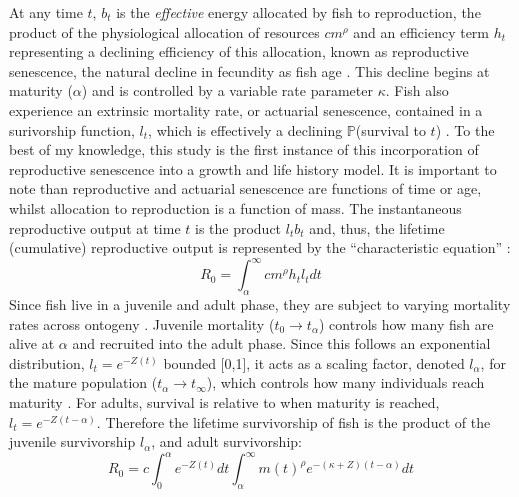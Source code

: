 \documentclass[a4paper]{article} %
\begin{document}
At any time $t$, $b_{t}$ is the \textit{effective} energy allocated by fish to reproduction, the product of the physiological allocation of resources $cm^{\rho}$ and an efficiency term $h_t$ representing a declining efficiency of this allocation, known as reproductive senescence, the natural decline in fecundity as fish age \autocite{Stearns2000, Benoit2018, Vrtilek2018}. This decline begins at maturity ($\alpha$) and is controlled by a variable rate parameter $\kappa$. Fish also experience an extrinsic mortality rate, or actuarial senescence, contained in a surivorship function, $l_t$, which is effectively a declining $\mathbb{P}$(survival to $t$) \autocite{Beverton1959, Peterson1984, Charnov1993,Walters1993, Charnov2001, Benoit2018, Laird2010, Reznick2002, Reznick2006}. To the best of my knowledge, this study is the first instance of this incorporation of reproductive senescence into a growth and life history model. It is important to note than reproductive and actuarial senescence are functions of time or age, whilst allocation to reproduction is a function of mass. The instantaneous reproductive output at time $t$ is the product $l_{t}b_{t}$ and, thus, the lifetime (cumulative) reproductive output is represented by the ``characteristic equation'' \autocite{roff1992evolution, roff2002life, stearns1992evolution, Arendt2011, Tsoukali2016}:
\begin{equation}
    R_{0} = \int_{\alpha}^{\infty}cm^{\rho}h_{t}l_t dt
\end{equation}
Since fish live in a juvenile and adult phase, they are subject to varying mortality rates across ontogeny \autocite{Charnov2001}. Juvenile mortality ($t_0 \rightarrow t_{\alpha}$) controls how many fish are alive at $\alpha$ and recruited into the adult phase. Since this follows an exponential distribution, $l_t = e^{-Z(t)}$ bounded [0,1], it acts as a scaling factor, denoted $l_{\alpha}$, for the mature population ($t_{\alpha} \rightarrow t_{\infty}$), which controls how many individuals reach maturity \autocite{Charnov1990-agematurity}. For adults, survival is relative to when maturity is reached, $l_{t} = e^{-Z(t-\alpha)}$. Therefore the lifetime survivorship of fish is the product of the juvenile survivorship $l_{\alpha}$, and adult survivorship: 
\begin{equation}
    R_{0} = c\int_{0}^{\alpha}e^{-Z(t)}dt\int_{\alpha}^{\infty} m(t)^{\rho} e^{-(\kappa+Z)(t-\alpha)} dt \label{LHT_optimisation}
\end{equation}
\end{document}
